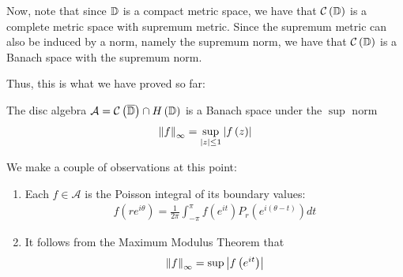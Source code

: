 Now, note that since $\mathbb D$ is a compact metric space, we have that ${\cal C} \left( \mathbb D \right)$ is a complete metric space with supremum metric. Since the supremum metric can also be induced by a norm, namely the supremum norm, we have that ${\cal C}\left( \mathbb D \right)$ is a Banach space with the supremum  norm.

Thus, this is what we have proved so far:

\begin{theorem}
    The disc algebra ${\cal A} ={\cal C} \left( \overline{ \mathbb D } \right) \cap H \left( \mathbb D \right)$ is a Banach space under the $\sup$ norm
    \begin{align*}
	\left\lVert f \right\rVert_{\infty} = \sup_{\left\lvert z \right\rvert\le 1} \left\lvert f\left( z \right) \right\rvert
    \end{align*}
    \label{thm:disc-algebra-is-B-space}
\end{theorem}

We make a couple of observations at this point:
\begin{enumerate}
    \item Each $f\in \mathcal A$ is the Poisson integral of its boundary values:
\begin{align*}
    f\left( re^{i\theta} \right) = \frac{1}{2\pi} \int_{-\pi}^{\pi} f\left( e^{it} \right) P_{r} \left( e^{i \left( \theta -t \right)} \right) dt
\end{align*}
\item It follows from the Maximum Modulus Theorem that 
    \begin{align*}
	\left\lVert f \right\rVert_{\infty} = \sup \left\lvert f\left( e^{it} \right) \right\rvert
    \end{align*}
\end{enumerate}

